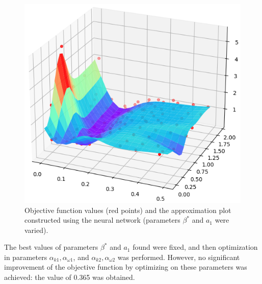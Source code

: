 \documentclass[mathematics,article,submit,pdftex,moreauthors]{Definitions/mdpi}
\begin{document}
\begin{figure}[H]
\begin{center}
\includegraphics[width=10.5 cm]{NN_100_point_.png}
\caption{Objective function values (red points) and the approximation plot constructed using the neural network (parameters $\beta^*$ and $a_1$ were varied).\label{NN_100_point}}
\end{center}
\end{figure}   
\unskip

The best values of parameters $\beta^*$ and $a_1$ found were fixed, and then optimization in parameters $\alpha_{k1}, \alpha_{\omega1}$, and $\alpha_{k2}, \alpha_{\omega2}$ was performed. 
However, no significant improvement of the objective function by optimizing on these parameters was achieved: the value of 0.365 was obtained.


%
%
\end{document}
